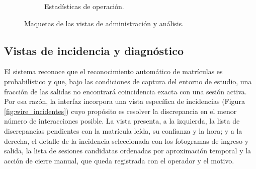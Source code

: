 \begin{figure}[htbp]
\begin{subfigure}[b]{0.48\textwidth}
        \caption{Estadísticas de operación.}
        \label{fig:wire_estadistica}
    \end{subfigure}

    \caption{Maquetas de las vistas de administración y análisis.}
    \label{fig:wireframes_admin}
\end{figure}

\subsection{Vistas de incidencia y diagnóstico}

El sistema reconoce que el reconocimiento automático de matrículas es
probabilístico y que, bajo las condiciones de captura del entorno de estudio,
una fracción de las salidas no encontrará coincidencia exacta con una sesión
activa. Por esa razón, la interfaz incorpora una vista específica de incidencias
(Figura \ref{fig:wire_incidentes}) cuyo propósito es resolver la discrepancia en
el menor número de interacciones posible. La vista presenta, a la izquierda, la
lista de discrepancias pendientes con la matrícula leída, su confianza y la hora;
y a la derecha, el detalle de la incidencia seleccionada con los fotogramas de
ingreso y salida, la lista de sesiones candidatas ordenadas por aproximación
temporal y la acción de cierre manual, que queda registrada con el operador y el
motivo.

